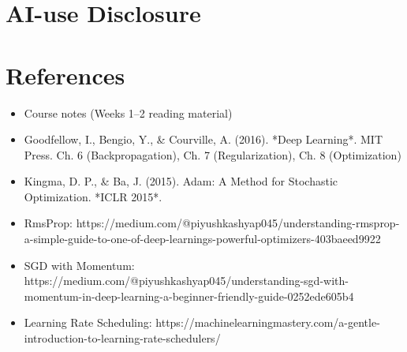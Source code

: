 \documentclass[11pt,a4paper]{article}
\begin{document}
\section{AI-use Disclosure}
\begin{center}
\end{center}

\section{References}
\begin{itemize}
    \item Course notes (Weeks 1–2 reading material)
    \item Goodfellow, I., Bengio, Y., & Courville, A. (2016). *Deep Learning*. MIT Press. Ch. 6 (Backpropagation), Ch. 7 (Regularization), Ch. 8 (Optimization)
    \item Kingma, D. P., & Ba, J. (2015). Adam: A Method for Stochastic Optimization. *ICLR 2015*.
    \item RmsProp:
    https://medium.com/@piyushkashyap045/understanding-rmsprop-a-simple-guide-to-one-of-deep-learnings-powerful-optimizers-403baeed9922
    \item SGD with Momentum:
    https://medium.com/@piyushkashyap045/understanding-sgd-with-momentum-in-deep-learning-a-beginner-friendly-guide-0252ede605b4
    \item Learning Rate Scheduling:
    https://machinelearningmastery.com/a-gentle-introduction-to-learning-rate-schedulers/
\end{itemize}
\end{document}
